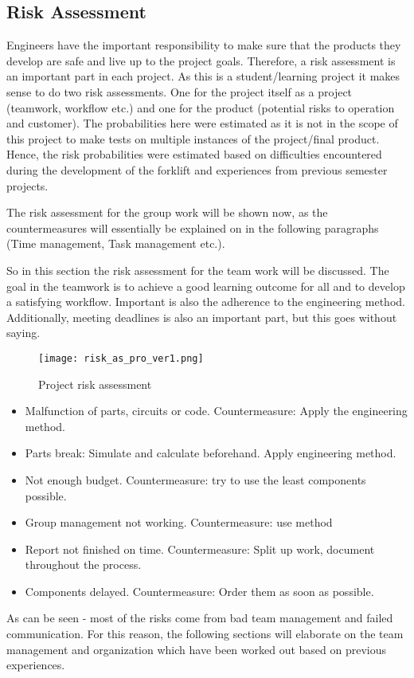\documentclass[../report.tex]{subfiles}
\begin{document}
\subsection{Risk Assessment}
Engineers have the important responsibility to make sure that the products
they develop are safe and live up to the project goals. Therefore, a
risk assessment is an important part in each project. As this is a student/learning
project it makes sense to do two risk assessments. One for the project itself as a project (teamwork, workflow etc.) and one for the product (potential risks to 
operation and customer). The probabilities here were estimated as it is not in the scope of 
this project to make tests on multiple instances of the project/final product. Hence, the risk probabilities were estimated 
based on difficulties encountered during the development of the forklift and experiences
from previous semester projects.

The risk assessment for the group work will be shown now, as the countermeasures will essentially be 
explained on in the following paragraphs (Time management, Task management etc.).

So in this section the risk assessment for the team work will be discussed. The goal in the 
teamwork is to achieve a good learning outcome for all and to develop a satisfying workflow.
Important is also the adherence to the engineering method. Additionally, meeting deadlines is also
an important part, but this goes without saying.

\begin{figure}[H]
    \centering
    \texttt{[image: risk\_as\_pro\_ver1.png]}
    \caption{Project risk assessment}
 \end{figure}
\begin{itemize}
    \item Malfunction of parts, circuits or code. Countermeasure: Apply the engineering method.
    \item Parts break: Simulate and calculate beforehand. Apply engineering method.
    \item Not enough budget. Countermeasure: try to use the least components possible.
    \item Group management not working. Countermeasure: use method
    \item Report not finished on time. Countermeasure: Split up work, document throughout the process. 
    \item Components delayed. Countermeasure: Order them as soon as possible.
    
\end{itemize}

As can be seen - most of the risks come from bad team management and failed communication. For this reason, 
the following sections will elaborate on the team management and organization which have been 
worked out based on previous experiences.
\end{document}
